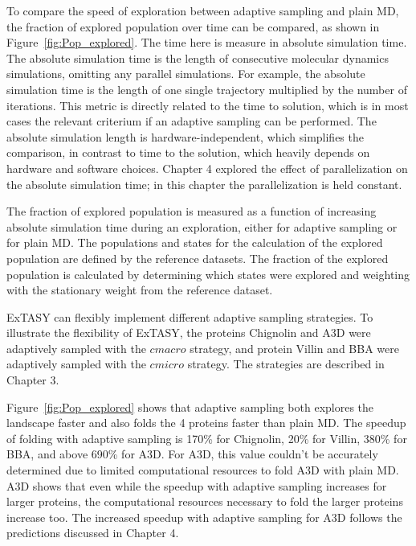 To compare the speed of exploration between adaptive sampling and plain MD, the fraction of explored population over time can be compared, as shown in Figure~\ref{fig:Pop_explored}. The time here is measure in absolute simulation time. The absolute simulation time is the length of consecutive molecular dynamics simulations, omitting any parallel simulations. For example, the absolute simulation time is the length of one single trajectory multiplied by the number of iterations. This metric is directly related to the time to solution, which is in most cases the relevant criterium if an adaptive sampling can be performed. The absolute simulation length is hardware-independent, which simplifies the comparison, in contrast to time to the solution, which heavily depends on hardware and software choices. Chapter 4 explored the effect of parallelization on the absolute simulation time; in this chapter the parallelization is held constant.

The fraction of explored population is measured as a function of increasing absolute simulation time during an exploration, either for adaptive sampling or for plain MD. The populations and states for the calculation of the explored population are defined by the reference datasets. The fraction of the explored population is calculated by determining which states were explored and weighting with the stationary weight from the reference dataset.

ExTASY can flexibly implement different adaptive sampling strategies. To illustrate the flexibility of ExTASY, the proteins Chignolin and A3D were adaptively sampled with the $cmacro$ strategy, and protein Villin and BBA were adaptively sampled with the $cmicro$ strategy. The strategies are described in Chapter 3. 

Figure~\ref{fig:Pop_explored} shows that adaptive sampling both explores the landscape faster and also folds the 4 proteins faster than plain MD. The speedup of folding with adaptive sampling is 170\% for Chignolin, 20\% for Villin, 380\% for BBA, and above 690\% for A3D. For A3D, this value couldn't be accurately determined due to limited computational resources to fold A3D with plain MD. A3D shows that even while the speedup with adaptive sampling increases for larger proteins, the computational resources necessary to fold the larger proteins increase too. The increased speedup with adaptive sampling for A3D follows the predictions discussed in Chapter 4.  

